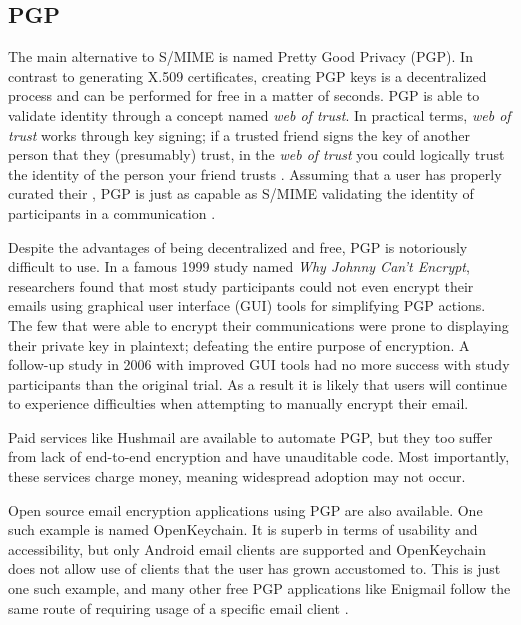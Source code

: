 \documentclass[10pt]{article}
\begin{document}
\begin{multicols}{2}
\subsection{PGP}
\par The main alternative to S/MIME is named Pretty Good Privacy (PGP). In contrast to generating X.509 certificates, creating PGP keys is a decentralized process and can be performed for free in a matter of seconds. PGP is able to validate identity through a concept named \textit{web of trust}. In practical terms, \textit{web of trust} works through key signing; if a trusted friend signs the key of another person that they (presumably) trust, in the \textit{web of trust} you could logically trust the identity of the person your friend trusts \cite{zimmermann1995official}. Assuming that a user has properly curated their , PGP is just as capable as S/MIME validating the identity of participants in a communication \cite{furnell2013usable}.
\par Despite the advantages of being decentralized and free, PGP is notoriously difficult to use. In a famous 1999 study named \textit{Why Johnny Can't Encrypt}, researchers found that most study participants could not even encrypt their emails using graphical user interface (GUI) tools for simplifying PGP actions. The few that were able to encrypt their communications were prone to displaying their private key in plaintext; defeating the entire purpose of encryption\cite{whitten1999johnny}. A follow-up study in 2006 with improved GUI tools had no more success with study participants than the original trial\cite{sheng2006johnny}. As a result it is likely that users will continue to experience difficulties when attempting to manually encrypt their email.
\par Paid services like Hushmail are available to automate PGP, but they too suffer from lack of end-to-end encryption and have unauditable code\cite{ciphermail-gateway,hushmail,eff-scorecard}. Most importantly, these services charge money, meaning widespread adoption may not occur.
\par Open source email encryption applications using PGP are also available. One such example is named OpenKeychain. It is superb in terms of usability and accessibility, but only Android email clients are supported and OpenKeychain does not allow use of clients that the user has grown accustomed to\cite{openkeychain}. This is just one such example, and many other free PGP applications like Enigmail follow the same route of requiring usage of a specific email client \cite{enigmail-handbook}.


\end{multicols}
\end{document}
